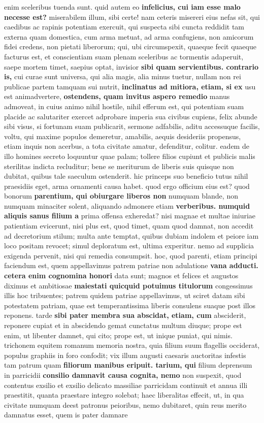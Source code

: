 enim sceleribus tuenda sunt. quid autem eo \textbf{\textbf{infelicius, cui iam esse malo necesse} est?} miserabilem illum, sibi certe! nam ceteris misereri eius nefas sit, qui caedibus ac rapinis potentiam exercuit, qui suspecta sibi cuncta reddidit tam externa quam domestica, cum arma metuat, ad arma confugiens, non amicorum fidei credens, non pietati liberorum; qui, ubi circumspexit, quaeque fecit quaeque facturus est, et conscientiam suam plenam sceleribus ac tormentis adaperuit, saepe mortem timet, saepius optat, invisior \textbf{sibi quam servientibus. contrario is,} cui curae sunt universa, qui alia magis, alia minus tuetur, nullam non rei publicae partem tamquam sui nutrit, \textbf{\textbf{inclinatus ad mitiora, etiam, si} ex} usu est animadvertere, \textbf{ostendens, quam invitus aspero remedio} manus admoveat, in cuius animo nihil hostile, nihil efferum est, qui potentiam suam placide ac salutariter exercet adprobare imperia sua civibus cupiens, felix abunde sibi visus, si fortunam suam publicarit, sermone adfabilis, aditu accessuque facilis, voltu, qui maxime populos demeretur, amabilis, aequis desideriis propensus, etiam inquis non acerbus, a tota civitate amatur, defenditur, colitur. eadem de illo homines secreto loquuntur quae palam; tollere filios cupiunt et publicis malis sterilitas indicta recluditur; bene se meriturum de liberis suis quisque non dubitat, quibus tale saeculum ostenderit. hic princeps suo beneficio tutus nihil praesidiis eget, arma ornamenti causa habet. quod ergo officium eius est? quod bonorum \textbf{parentium, qui obiurgare liberos non} numquam blande, non numquam minaciter solent, aliquando admonere etiam \textbf{verberibus. numquid aliquis sanus filium a} prima offensa exheredat? nisi magnae et multae iniuriae patientiam evicerunt, nisi plus est, quod timet, quam quod damnat, non accedit ad decretorium stilum; multa ante temptat, quibus dubiam indolem et peiore iam loco positam revocet; simul deploratum est, ultima experitur. nemo ad supplicia exigenda pervenit, nisi qui remedia consumpsit. hoc, quod parenti, etiam principi faciendum est, quem appellavimus patrem patriae non adulatione \textbf{vana adducti. cetera enim cognomina honori} data sunt; magnos et felices et augustos diximus et ambitiosae \textbf{maiestati quicquid potuimus titulorum} congessimus illis hoc tribuentes; patrem quidem patriae appellavimus, ut sciret datam sibi potestatem patriam, quae est temperantissima liberis consulens suaque post illos reponens. tarde \textbf{sibi pater membra sua abscidat, etiam, cum} absciderit, reponere cupiat et in abscidendo gemat cunctatus multum diuque; prope est enim, ut libenter damnet, qui cito; prope est, ut inique puniat, qui nimis. trichonem equitem romanum memoria nostra, quia filium suum flagellis occiderat, populus graphiis in foro confodit; vix illum augusti caesaris auctoritas infestis tam patrum quam \textbf{filiorum manibus eripuit. tarium, qui} filium deprensum in parricidii \textbf{consilio damnavit causa cognita, nemo} non suspexit, quod contentus exsilio et exsilio delicato massiliae parricidam continuit et annua illi praestitit, quanta praestare integro solebat; haec liberalitas effecit, ut, in qua civitate numquam deest patronus peioribus, nemo dubitaret, quin reus merito damnatus esset, quem is pater damnare 